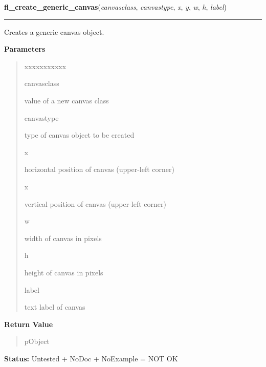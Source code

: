 \hspace{.8\funcindent}\begin{boxedminipage}{\funcwidth}

    \raggedright \textbf{fl\_create\_generic\_canvas}(\textit{canvasclass}, \textit{canvastype}, \textit{x}, \textit{y}, \textit{w}, \textit{h}, \textit{label})

    \vspace{-1.5ex}

    \rule{\textwidth}{0.5\fboxrule}
\setlength{\parskip}{2ex}
    Creates a generic canvas object.

\setlength{\parskip}{1ex}
      \textbf{Parameters}
      \vspace{-1ex}

      \begin{quote}
        \begin{Ventry}{xxxxxxxxxxx}

          \item[canvasclass]

          value of a new canvas class

          \item[canvastype]

          type of canvas object to be created

          \item[x]

          horizontal position of canvas (upper-left corner)

          \item[x]

          vertical position of canvas (upper-left corner)

          \item[w]

          width of canvas in pixels

          \item[h]

          height of canvas in pixels

          \item[label]

          text label of canvas

        \end{Ventry}

      \end{quote}

      \textbf{Return Value}
    \vspace{-1ex}

      \begin{quote}
      pObject

      \end{quote}

\textbf{Status:} Untested + NoDoc + NoExample = NOT OK



    \end{boxedminipage}

